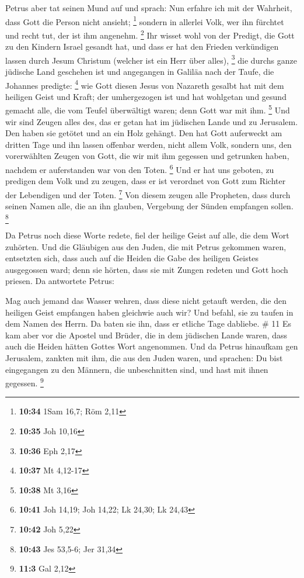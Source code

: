  Petrus aber tat seinen Mund auf und sprach: Nun erfahre
ich mit der Wahrheit, dass Gott die Person nicht ansieht; \footnote{\textbf{10:34}
  1Sam 16,7; Röm 2,11}  sondern in allerlei Volk, wer ihn
fürchtet und recht tut, der ist ihm angenehm. \footnote{\textbf{10:35}
  Joh 10,16}  Ihr wisset wohl von der Predigt, die Gott zu
den Kindern Israel gesandt hat, und dass er hat den Frieden verkündigen
lassen durch Jesum Christum (welcher ist ein Herr über alles),
\footnote{\textbf{10:36} Eph 2,17}  die durchs ganze
jüdische Land geschehen ist und angegangen in Galiläa nach der Taufe,
die Johannes predigte: \footnote{\textbf{10:37} Mt 4,12-17}
 wie Gott diesen Jesus von Nazareth gesalbt hat mit dem
heiligen Geist und Kraft; der umhergezogen ist und hat wohlgetan und
gesund gemacht alle, die vom Teufel überwältigt waren; denn Gott war mit
ihm. \footnote{\textbf{10:38} Mt 3,16}  Und wir sind Zeugen
alles des, das er getan hat im jüdischen Lande und zu Jerusalem. Den
haben sie getötet und an ein Holz gehängt.  Den hat Gott
auferweckt am dritten Tage und ihn lassen offenbar werden, 
nicht allem Volk, sondern uns, den vorerwählten Zeugen von Gott, die wir
mit ihm gegessen und getrunken haben, nachdem er auferstanden war von
den Toten. \footnote{\textbf{10:41} Joh 14,19; Joh 14,22; Lk 24,30; Lk
  24,43}  Und er hat uns geboten, zu predigen dem Volk und
zu zeugen, dass er ist verordnet von Gott zum Richter der Lebendigen und
der Toten. \footnote{\textbf{10:42} Joh 5,22}  Von diesem
zeugen alle Propheten, dass durch seinen Namen alle, die an ihn glauben,
Vergebung der Sünden empfangen sollen. \footnote{\textbf{10:43} Jes
  53,5-6; Jer 31,34}

 Da Petrus noch diese Worte redete, fiel der heilige Geist
auf alle, die dem Wort zuhörten.  Und die Gläubigen aus den
Juden, die mit Petrus gekommen waren, entsetzten sich, dass auch auf die
Heiden die Gabe des heiligen Geistes ausgegossen ward; 
denn sie hörten, dass sie mit Zungen redeten und Gott hoch priesen. Da
antwortete Petrus:

 Mag auch jemand das Wasser wehren, dass diese nicht
getauft werden, die den heiligen Geist empfangen haben gleichwie auch
wir?  Und befahl, sie zu taufen in dem Namen des Herrn. Da
baten sie ihn, dass er etliche Tage dabliebe. \# 11  Es kam
aber vor die Apostel und Brüder, die in dem jüdischen Lande waren, dass
auch die Heiden hätten Gottes Wort angenommen.  Und da
Petrus hinaufkam gen Jerusalem, zankten mit ihm, die aus den Juden
waren,  und sprachen: Du bist eingegangen zu den Männern,
die unbeschnitten sind, und hast mit ihnen gegessen. \footnote{\textbf{11:3}
  Gal 2,12}

